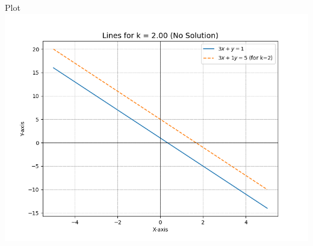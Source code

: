 \documentclass{beamer}
\begin{document}
\begin{frame}{Plot}
    \centering
    \includegraphics[width=\columnwidth, height=0.9\textheight, keepaspectratio]{figs/fig5.png}     
\end{frame}
\end{document}
